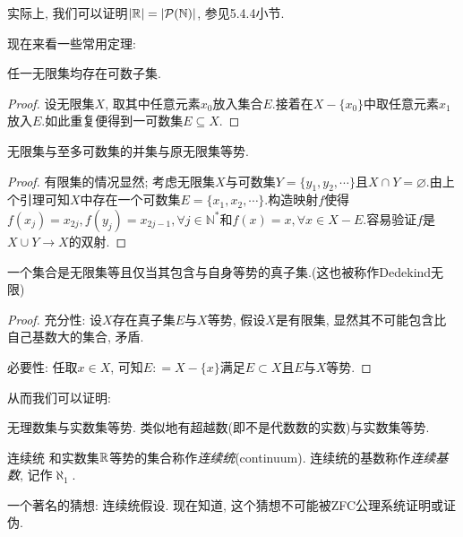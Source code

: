 实际上, 我们可以证明$|\mathbb{R}| = |\mathcal{P}(\mathbb{N})|$, 参见5.4.4小节. 

现在来看一些常用定理: 

\begin{lemma}{}
	任一无限集均存在可数子集.
\end{lemma}
\begin{proof}
	设无限集$X$, 取其中任意元素$x_0$放入集合$E$.接着在$X-\{ x_0 \}$中取任意元素$x_1$放入$E$.如此重复便得到一可数集$E \subseteq X$.
\end{proof}

\begin{theorem}{}
	无限集与至多可数集的并集与原无限集等势.
\end{theorem}
\begin{proof}
	有限集的情况显然; 考虑无限集$X$与可数集$Y=\{ y_1, y_2, \cdots \}$且$X \cap Y = \varnothing$.由上个引理可知$X$中存在一个可数集$E=\{ x_1, x_2, \cdots \}$.构造映射$f$使得$f(x_j)=x_{2j}, f(y_j)=x_{2j-1},  \forall j \in \mathbb{N}^*$和$f(x)=x, \forall x \in X-E$.容易验证$f$是$X \cup Y \to X$的双射.
\end{proof}

\begin{theorem}{}
	一个集合是无限集等且仅当其包含与自身等势的真子集.(这也被称作Dedekind无限)
\end{theorem}
\begin{proof}
	充分性: 设$X$存在真子集$E$与$X$等势, 假设$X$是有限集, 显然其不可能包含比自己基数大的集合, 矛盾.
	
	必要性: 任取$x \in X$, 可知$E: =X-\{x\}$满足$E \subset X$且$E$与$X$等势.
\end{proof}

从而我们可以证明: 

\begin{proposition}{}
	无理数集与实数集等势. 类似地有超越数(即不是代数数的实数)与实数集等势.
\end{proposition}

\begin{definition}{连续统}
	和实数集$\mathbb{R}$等势的集合称作\textit{连续统}(continuum). 连续统的基数称作\textit{连续基数}, 记作$\aleph _1$.
\end{definition}

一个著名的猜想: 连续统假设. 现在知道, 这个猜想不可能被ZFC公理系统证明或证伪.





